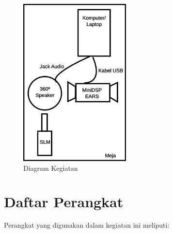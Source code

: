 \documentclass[12pt]{book}
\begin{document}
	\begin{figure}[!ht]
		\centering
		\includegraphics[width=0.5\textwidth]{images/diagram/tesearslm}
		\caption{Diagram Kegiatan}
	\end{figure}

	\newpage
	\section{Daftar Perangkat}

	Perangkat yang digunakan dalam kegiatan ini meliputi:
\end{document}
